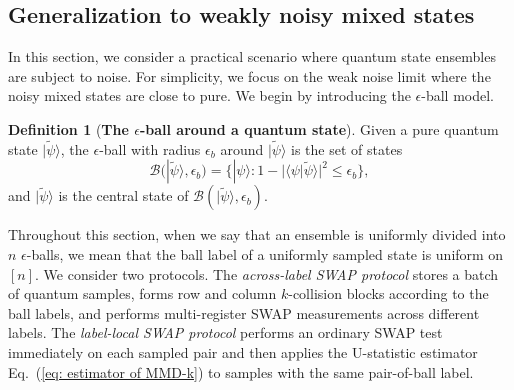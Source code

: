 \documentclass[aps,prx,reprint,superscriptaddress,amsmath,amssymb,longbibliography,floatfix]{revtex4-2}
\newcommand{\abs}[1]{\lvert #1\rvert}
\providecommand{\ket}[1]{|#1 \rangle}
\providecommand{\braket}[2]{\langle #1|#2 \rangle}
\newcommand{\scB}{\mathcal{B}}
\theoremstyle{plain}
\theoremstyle{definition}
\newtheorem{definition}[theorem]{Definition}
\theoremstyle{remark}
\begin{document}
\subsection{Generalization to weakly noisy mixed states}
\label{app: mixed states} 

In this section, we consider a practical scenario where quantum state ensembles are subject to noise. For simplicity, we focus on the weak noise limit where the noisy mixed states are close to pure. We begin by introducing the $\epsilon$-ball model.

\begin{definition}[\textbf{The $\epsilon$-ball around a quantum state}]
    Given a pure quantum state $\ket{\widetilde{\psi}}$, the $\epsilon$-ball with radius $\epsilon_b$ around $\ket{\widetilde{\psi}}$ is the set of states
    \begin{equation}
        \scB(\ket{\widetilde{\psi}},\epsilon_b)
        =
        \{\ket{\psi}:1-\abs{\braket{\psi}{\widetilde{\psi}}}^2\le\epsilon_b\},
    \end{equation}
    and $\ket{\widetilde{\psi}}$ is the central state of $\scB(\ket{\widetilde{\psi}},\epsilon_b)$.\label{def: epsilon ball}
\end{definition}

Throughout this section, when we say that an ensemble is uniformly divided into $n$ $\epsilon$-balls, we mean that the ball label of a uniformly sampled state is uniform on $[n]$. We consider two protocols. The \emph{across-label SWAP protocol} stores a batch of quantum samples, forms row and column $k$-collision blocks according to the ball labels, and performs multi-register SWAP measurements across different labels. The \emph{label-local SWAP protocol} performs an ordinary SWAP test immediately on each sampled pair and then applies the U-statistic estimator Eq.~(\ref{eq: estimator of MMD-k}) to samples with the same pair-of-ball label.
\end{document}
